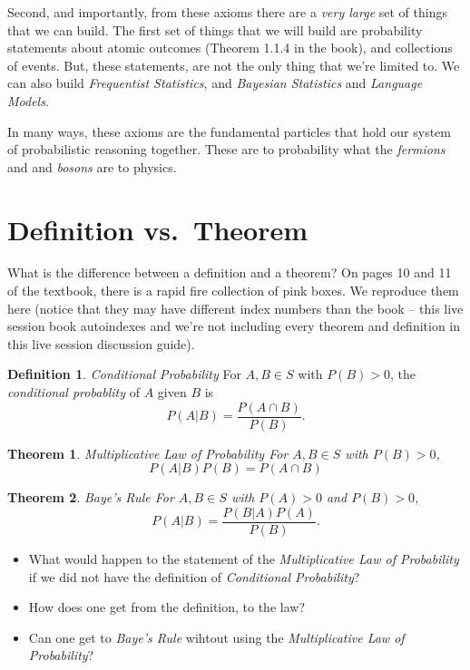 \documentclass[
]{book}
\providecommand{\tightlist}{%
  \setlength{\itemsep}{0pt}\setlength{\parskip}{0pt}}
\newtheorem{theorem}{Theorem}[chapter]
\theoremstyle{definition}
\newtheorem{definition}{Definition}[chapter]
\theoremstyle{definition}
\theoremstyle{definition}
\theoremstyle{definition}
\theoremstyle{remark}
\begin{document}
Second, and importantly, from these axioms there are a \emph{very large} set of things that we can build. The first set of things that we will build are probability statements about atomic outcomes (Theorem 1.1.4 in the book), and collections of events. But, these statements, are not the only thing that we're limited to. We can also build \emph{Frequentist Statistics}, and \emph{Bayesian Statistics} and \emph{Language Models}.

In many ways, these axioms are the fundamental particles that hold our system of probabilistic reasoning together. These are to probability what the \emph{fermions} and and \emph{bosons} are to physics.

\hypertarget{definition-vs.-theorem}{%
\section{Definition vs.~Theorem}\label{definition-vs.-theorem}}

What is the difference between a definition and a theorem? On pages 10 and 11 of the textbook, there is a rapid fire collection of pink boxes. We reproduce them here (notice that they may have different index numbers than the book -- this live session book autoindexes and we're not including every theorem and definition in this live session discussion guide).

\begin{definition}
\emph{Conditional Probability} For \(A, B \in S\) with \(P(B) > 0\), the \emph{conditional probablity} of \(A\) given \(B\) is \[P(A|B) = \frac{P(A\cap B)}{P(B)}.\]
\end{definition}

\begin{theorem}
\emph{Multiplicative Law of Probability} For \(A, B \in S\) with \(P(B) > 0\), \[P(A|B)P(B) = P(A \cap B)\]
\end{theorem}

\begin{theorem}
\emph{Baye's Rule} For \(A, B \in S\) with \(P(A) > 0\) and \(P(B) > 0\), \[P(A|B) = \frac{P(B|A)P(A)}{P(B)}.\]
\end{theorem}

\begin{discussion-question}

\begin{itemize}
\tightlist
\item
  What would happen to the statement of the \emph{Multiplicative Law of Probability} if we did not have the definition of \emph{Conditional Probability}?
\item
  How does one get from the definition, to the law?
\item
  Can one get to \emph{Baye's Rule} wihtout using the \emph{Multiplicative Law of Probability}?
\end{itemize}

\end{discussion-question}
\end{document}
